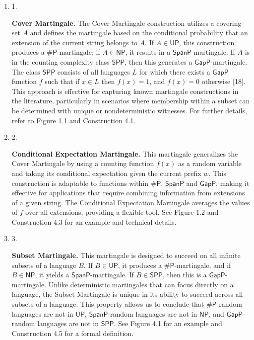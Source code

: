 \documentclass[10pt,a4paper]{article}
\begin{document}
\begin{enumerate}


\item[] 
1. 


\textbf{Cover Martingale.} The Cover Martingale construction utilizes a covering set $A$ and defines the martingale based on the conditional probability that an extension of the current string belongs to $A$. If $A\in\mathsf{UP}$, this construction produces a ${\mathsf{\#}\mathsf{P}}$-martingale; if $A\in\mathsf{NP}$, it results in a $\mathsf{SpanP}$-martingale. If $A$ is in the counting complexity class $\mathsf{SPP}$, then this generates a $\mathsf{GapP}$-martingale. The class $\mathsf{SPP}$ consists of all languages $L$ for which there exists a $\mathsf{GapP}$ function $f$ such that if $x\in L$ then $f(x)=1$, and $f(x)=0$ otherwise [18]. This approach is effective for capturing known martingale constructions in the literature, particularly in scenarios where membership within a subset can be determined with unique or nondeterministic witnesses. For further details, refer to Figure 1.1 and Construction 4.1.\par





\item[] 
2. 


\textbf{Conditional Expectation Martingale.} This martingale generalizes the Cover Martingale by using a counting function $f(x)$ as a random variable and taking its conditional expectation given the current prefix $w$. This construction is adaptable to functions within ${\mathsf{\#}\mathsf{P}}$, $\mathsf{SpanP}$ and $\mathsf{GapP}$, making it effective for applications that require combining information from extensions of a given string. The Conditional Expectation Martingale averages the values of $f$ over all extensions, providing a flexible tool. See Figure 1.2 and Construction 4.3 for an example and technical details.\par





\item[] 
3. 


\textbf{Subset Martingale.} This martingale is designed to succeed on all infinite subsets of a language $B$. If $B\in\mathsf{UP}$, it produces a ${\mathsf{\#}\mathsf{P}}$-martingale, and if $B\in\mathsf{NP}$, it yields a $\mathsf{SpanP}$-martingale. If $B\in\mathsf{SPP}$, then this is a $\mathsf{GapP}$-martingale. Unlike deterministic martingales that can focus directly on a language, the Subset Martingale is unique in its ability to succeed across all subsets of a language. This property allows us to conclude that ${\mathsf{\#}\mathsf{P}}$-random languages are not in $\mathsf{UP}$, $\mathsf{SpanP}$-random languages are not in $\mathsf{NP}$, and $\mathsf{GapP}$-random languages are not in $\mathsf{SPP}$. See Figure 4.1 for an example and Construction 4.5 for a formal definition.\par






\end{enumerate}
\end{document}
